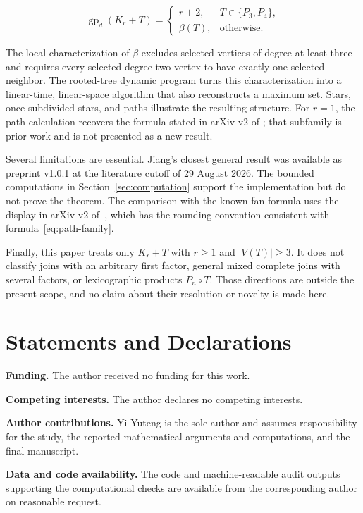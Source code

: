 \documentclass[11pt,a4paper]{article}
\numberwithin{equation}{section}
\begin{document}
\[
\operatorname{gp}_d(K_r+T)=
\begin{cases}
r+2,&T\in\{P_3,P_4\},\\
\beta(T),&\text{otherwise}.
\end{cases}
\]

The local characterization of \(\beta\) excludes selected vertices of
degree at least three and requires every selected degree-two vertex to
have exactly one selected neighbor. The rooted-tree dynamic program
turns this characterization into a linear-time, linear-space algorithm
that also reconstructs a maximum set. Stars, once-subdivided stars, and
paths illustrate the resulting structure. For \(r=1\), the path
calculation recovers the formula stated in arXiv v2 of
\cite{tian-et-al-removal}; that subfamily is prior work and is not presented as
a new result.

Several limitations are essential. Jiang's closest general result
\cite{jiang-complete-first-factor} was available as preprint v1.0.1 at the
literature cutoff of 29 August 2026. The bounded computations in
Section~\ref{sec:computation} support the implementation but do not prove the
theorem. The comparison with the known fan formula uses the display in arXiv
v2 of~\cite{tian-et-al-removal}, which has the rounding convention consistent
with formula~\eqref{eq:path-family}.

Finally, this paper treats only \(K_r+T\) with \(r\ge 1\) and
\(|V(T)|\ge 3\). It does not classify joins with an arbitrary first
factor, general mixed complete joins with several factors, or
lexicographic products \(P_n\circ T\). Those directions are outside the
present scope, and no claim about their resolution or novelty is made
here.

\section*{Statements and Declarations}

\noindent\textbf{Funding.}
The author received no funding for this work.

\medskip
\noindent\textbf{Competing interests.}
The author declares no competing interests.

\medskip
\noindent\textbf{Author contributions.}
Yi Yuteng is the sole author and assumes responsibility for the study, the
reported mathematical arguments and computations, and the final manuscript.

\medskip
\noindent\textbf{Data and code availability.}
The code and machine-readable audit outputs supporting the computational
checks are available from the corresponding author on reasonable request.
\end{document}
